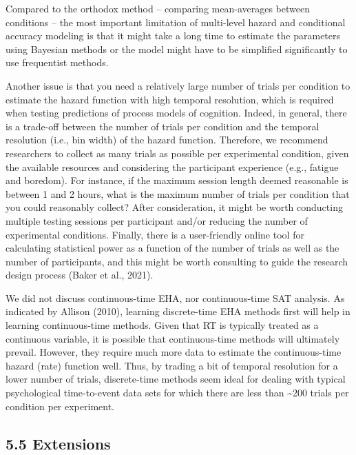 \documentclass[
  man, donotrepeattitle,floatsintext]{apa6}
\begin{document}
Compared to the orthodox method -- comparing mean-averages between conditions -- the most important limitation of multi-level hazard and conditional accuracy modeling is that it might take a long time to estimate the parameters using Bayesian methods or the model might have to be simplified significantly to use frequentist methods.

Another issue is that you need a relatively large number of trials per condition to estimate the hazard function with high temporal resolution, which is required when testing predictions of process models of cognition. Indeed, in general, there is a trade-off between the number of trials per condition and the temporal resolution (i.e., bin width) of the hazard function. Therefore, we recommend researchers to collect as many trials as possible per experimental condition, given the available resources and considering the participant experience (e.g., fatigue and boredom). For instance, if the maximum session length deemed reasonable is between 1 and 2 hours, what is the maximum number of trials per condition that you could reasonably collect? After consideration, it might be worth conducting multiple testing sessions per participant and/or reducing the number of experimental conditions. Finally, there is a user-friendly online tool for calculating statistical power as a function of the number of trials as well as the number of participants, and this might be worth consulting to guide the research design process (Baker et al., 2021).

We did not discuss continuous-time EHA, nor continuous-time SAT analysis. As indicated by Allison (2010), learning discrete-time EHA methods first will help in learning continuous-time methods. Given that RT is typically treated as a continuous variable, it is possible that continuous-time methods will ultimately prevail. However, they require much more data to estimate the continuous-time hazard (rate) function well. Thus, by trading a bit of temporal resolution for a lower number of trials, discrete-time methods seem ideal for dealing with typical psychological time-to-event data sets for which there are less than \textasciitilde200 trials per condition per experiment.

\subsection{5.5 Extensions}\label{extensions}
\end{document}
